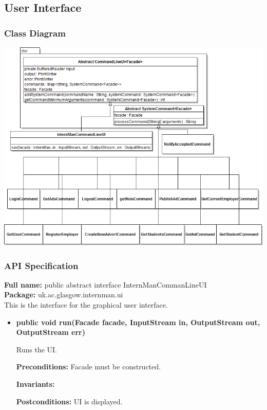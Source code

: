 \documentclass[11pt]{l3deliverable}
\begin{document}
\newpage

\subsection{User Interface}

\subsubsection{Class Diagram}

\includegraphics[scale=0.65,angle=90]{UIClassDiagram.png}

\subsubsection{API Specification}

\textbf{Full name:} public abstract interface InternManCommanLineUI\\

\textbf{Package:} uk.ac.glasgow.internman.ui\\

This is the interface for the graphical user interface.

\begin{itemize}

\item{\textbf{public void run(Facade facade, InputStream in, OutputStream out,
			OutputStream err)}

Runs the UI.

\textbf{Preconditions:} Facade must be constructed.

\textbf{Invariants:}

\textbf{Postconditions:} UI is displayed.}

\end{itemize}
\end{document}
